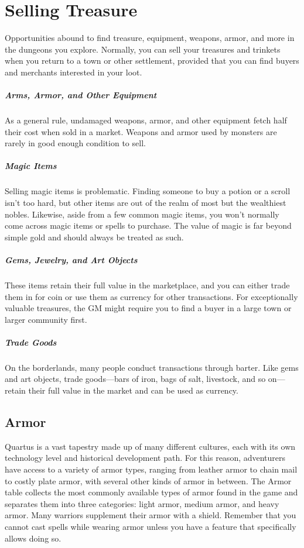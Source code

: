\section{Selling Treasure}

Opportunities abound to find treasure, equipment, weapons, armor, and more in the dungeons you explore. Normally, you can sell your treasures and trinkets when you return to a town or other settlement, provided that you can find buyers and merchants interested in your loot.

\subparagraph*{Arms, Armor, and Other Equipment} As a general rule, undamaged weapons, armor, and other equipment fetch half their cost when sold in a market. Weapons and armor used by monsters are rarely in good enough condition to sell.

\subparagraph*{Magic Items} Selling magic items is problematic. Finding someone to buy a potion or a scroll isn't too hard, but other items are out of the realm of most but the wealthiest nobles. Likewise, aside from a few common magic items, you won't normally come across magic items or spells to purchase. The value of magic is far beyond simple gold and should always be treated as such.

\subparagraph*{Gems, Jewelry, and Art Objects} These items retain their full value in the marketplace, and you can either trade them in for coin or use them as currency for other transactions. For exceptionally valuable treasures, the GM might require you to find a buyer in a large town or larger community first.

\subparagraph*{Trade Goods} On the borderlands, many people conduct transactions through barter. Like gems and art objects, trade goods—bars of iron, bags of salt, livestock, and so on—retain their full value in the market and can be used as currency.

\subsection{Armor}

Quartus is a vast tapestry made up of many different cultures, each with its own technology level and historical development path. For this reason, adventurers have access to a variety of armor types, ranging from leather armor to chain mail to costly plate armor, with several other kinds of armor in between. The Armor table collects the most commonly available types of armor found in the game and separates them into three categories: light armor, medium armor, and heavy armor. Many warriors supplement their armor with a shield. Remember that you cannot cast spells while wearing armor unless you have a feature that specifically allows doing so.

